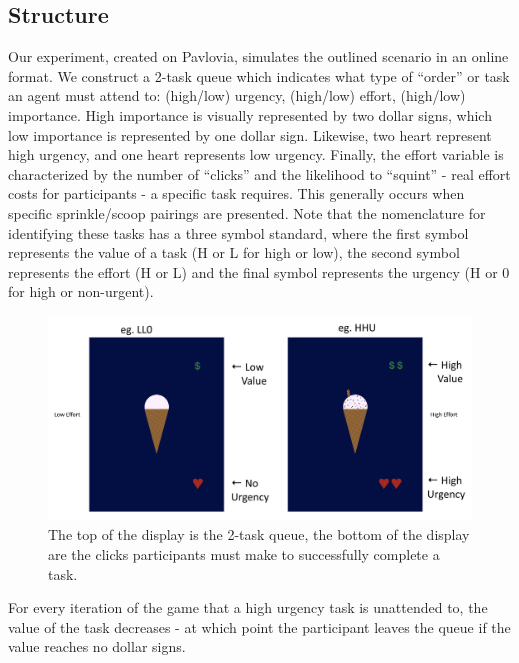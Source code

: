 \hypertarget{structure}{%
\subsection{Structure}\label{structure}}

Our experiment, created on Pavlovia, simulates the outlined scenario in
an online format. We construct a 2-task queue which indicates what type
of ``order'' or task an agent must attend to: (high/low) urgency,
(high/low) effort, (high/low) importance. High importance is visually
represented by two dollar signs, which low importance is represented by
one dollar sign. Likewise, two heart represent high urgency, and one
heart represents low urgency. Finally, the effort variable is
characterized by the number of ``clicks'' and the likelihood to
``squint'' - real effort costs for participants - a specific task
requires. This generally occurs when specific sprinkle/scoop pairings
are presented. Note that the nomenclature for identifying these tasks
has a three symbol standard, where the first symbol represents the value
of a task (H or L for high or low), the second symbol represents the
effort (H or L) and the final symbol represents the urgency (H or 0 for
high or non-urgent).

\begin{figure}

{\centering \includegraphics{images/2ice.png}

}

\caption{The top of the display is the 2-task queue, the bottom of the
display are the clicks participants must make to successfully complete a
task.}

\end{figure}

For every iteration of the game that a high urgency task is unattended
to, the value of the task decreases - at which point the participant
leaves the queue if the value reaches no dollar signs.

